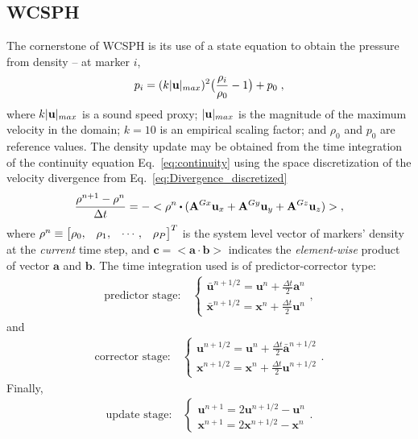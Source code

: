 \subsection{WCSPH}\label{sec:WCSPH}
The cornerstone of WCSPH is its use of a state equation to obtain the pressure from density -- at marker $i$,
\begin{equation}
\label{eq:State_eq}
p_i = (k| {\bf u}|_{max})^2\big(\frac{\rho_i}{\rho_0}-1\big)+p_0 \; ,
\end{equation}
where $k|{\bf u}|_{max}$ is a sound speed proxy; $|{\bf u}|_{max}$ is the magnitude of the maximum velocity in the domain; $k=10$ is an empirical scaling factor; and $\rho_0$ and $p_0$ are reference values. The density update may be obtained from the time integration of the continuity equation Eq.~\ref{eq:continuity} using the space discretization of the velocity divergence from Eq.~\ref{eq:Divergence_discretized}
\begin{equation}
\label{eq:rho2}
\frac{\mathbf{\rho}^{n+1}-\mathbf{\rho}^{n}}{\Delta t}=-<\mathbf{\rho}^n \bigcdot ({\mathbf{A}^{Gx} \mathbf{u}_x+\mathbf{A}^{Gy} \mathbf{u}_y+\mathbf{A}^{Gz}\mathbf{u}_z})> \;,
\end{equation}
where $\mathbf{\rho}^{n}\equiv\begin{bmatrix}
\rho_0,& \rho_1,& \cdots,& \rho_{P}\end{bmatrix}^T$ is the system level vector of markers' density at the \textit{current} time step, and $\mathbf{c}=<\mathbf{a} \cdot \mathbf{b}>$ indicates the \textit{element-wise} product of vector $\mathbf{a}$ and $\mathbf{b}$.
The time integration used is of predictor-corrector type:
\begin{align*}
\text{predictor stage:} \quad
\begin{cases}
{\bar{\mathbf{u}}}^{n+1/2}=\mathbf{u}^n+ \frac{\Delta t}{2} \mathbf{a}^n  \\ 
{\bar{\mathbf{x}}}^{n+1/2}=\mathbf{x}^n+ \frac{\Delta t}{2} \mathbf{u}^n
\end{cases} ,
\end{align*}
and
\begin{align*} 
\text{corrector stage:} \quad
\begin{cases}
{\mathbf{u}}^{n+1/2}=\mathbf{u}^n+ \frac{\Delta t}{2} {\bar{\mathbf{a}}}^{n+1/2} \\ 
{\mathbf{x}}^{n+1/2}=\mathbf{x}^n+ \frac{\Delta t}{2} \mathbf{u}^{n+1/2}
\end{cases} .
\end{align*}
Finally,
\begin{align*} 
\text{update stage:} \quad
\begin{cases}
{\mathbf{u}}^{n+1}=2\mathbf{u}^{n+1/2}-\mathbf{u}^n  \\ 
{\mathbf{x}}^{n+1}=2\mathbf{x}^{n+1/2}-\mathbf{x}^n
\end{cases} .
\end{align*}
